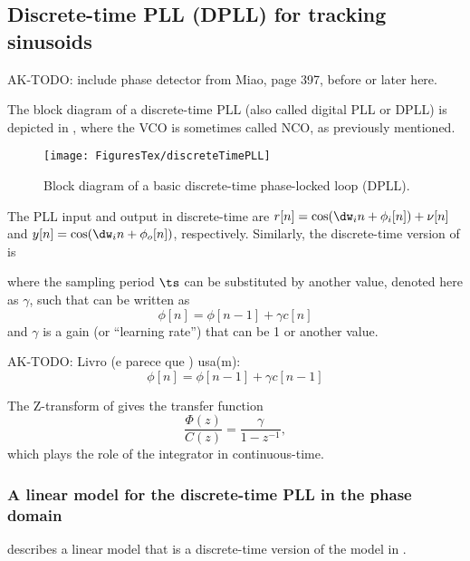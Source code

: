 \subsection{Discrete-time PLL (DPLL) for tracking sinusoids}

AK-TODO: include phase detector from Miao, page 397, before or later here.

The block diagram of a discrete-time PLL (also called digital PLL or DPLL) is depicted in 
, where the VCO is sometimes called NCO, as previously mentioned. 


\begin{figure}[htbp]
	\centering
		\texttt{[image: FiguresTex/discreteTimePLL]}		
	\caption{Block diagram of a basic discrete-time phase-locked loop (DPLL).\label{fig:discreteTimePLL}}
\end{figure}

The PLL input and output in discrete-time are $r[n] = \cos(\dw_i n + \phi_i[n]) + \nu[n]$ and $y[n] = \cos(\dw_i n + \phi_o[n])$, respectively.
Similarly, the discrete-time version of  is

where the sampling period $\ts$ can be substituted by another value, denoted here as $\gamma$, such that  can be written as 
\begin{equation}
\phi[n] = \phi[n-1] + \gamma c[n]
\label{eq:vcoControlDiscreteTime}
\end{equation}
and $\gamma$ is a gain (or ``learning rate'') that can be 1 or another value.

AK-TODO: Livro \cite{Farhang10} (e parece que \cite{Miao07}) usa(m):
\begin{equation}
\phi[n] = \phi[n-1] + \gamma c[n-1]
\label{eq:vcoControlDiscreteTime2}
\end{equation}


The Z-transform of  gives the transfer function
\begin{equation}
\frac{\Phi(z)}{C(z)} = \frac{\gamma}{1-z^{-1}},
\label{eq:vcoControlZtransform}
\end{equation}
which plays the role of the integrator in continuous-time.

\subsubsection{A linear model for the discrete-time PLL in the phase domain}

 describes a linear model that is
a discrete-time version of the model in .


